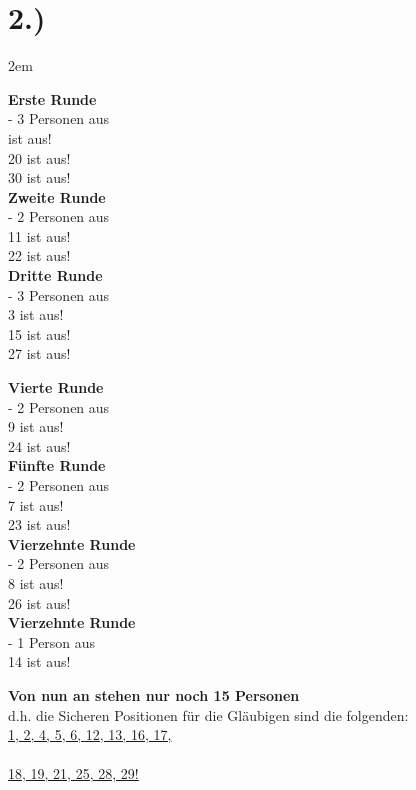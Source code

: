 \documentclass[titlepage]{article}
\newcommand{\n}{\newline}
\begin{document}
		\section*{2.)}
		\begingroup
		\leftskip2em
		\begin{multicols}{3}
			
			\noindent
			\textbf{Erste Runde}\\ - 3 Personen aus\\
			 ist aus!\\
			20 ist aus!\\
			30 ist aus!\\
			\n\textbf{Zweite Runde}\\ - 2 Personen aus\\
			11 ist aus!\\
			22 ist aus!\\
			\n\textbf{Dritte Runde}\\ - 3 Personen aus\\
			3 ist aus!\\
			15 ist aus!\\
			27 ist aus!\\
			\columnbreak
			
			\noindent
			\textbf{Vierte Runde}\\ - 2 Personen aus\\
			9 ist aus!\\
			24 ist aus!\\
			\n\textbf{Fünfte Runde}\\ - 2 Personen aus\\
			7 ist aus!\\
			23 ist aus!\\
			\n\textbf{Vierzehnte Runde}\\ - 2 Personen aus\\
			8 ist aus!\\
			26 ist aus!\\
			\n\textbf{Vierzehnte Runde}\\ - 1 Person aus\\
			14 ist aus!\\
			\columnbreak
			
			\noindent
			\textbf{Von nun an stehen nur noch 15 Personen} \\d.h. die Sicheren Positionen für die Gläubigen sind die folgenden:\\\n
			\underline{\underline{1, 2, 4, 5, 6, 12, 13, 16, 17,}}\\\\
			\underline{\underline{18, 19, 21, 25, 28, 29!}}

		\end{multicols}
		\endgroup
		
\end{document}
